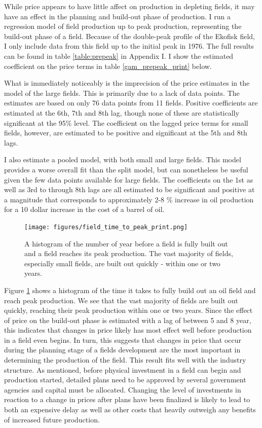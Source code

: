 \documentclass[11pt]{article}
\begin{document}
While price appears to have little affect on production in depleting fields, it may have an effect in the planning and build-out phase of production. I run a regression model of field production up to peak production, representing the build-out phase of a field.  Because of the double-peak profile of the Ekofisk field, I only include data from this field up to the initial peak in 1976.  The full results can be found in table \ref{table:prepeak} in Appendix I.  I show the estimated coefficient on the price terms in table \ref{gam_prepeak_print} below.  

What is immediately noticeably is the imprecision of the price estimates in the model of the large fields.  This is primarily due to a lack of data points.  The estimates are based on only 76 data points from 11 fields.  Positive coefficients are estimated at the 6th, 7th and 8th lag, though none of these are statistically significant at the 95\% level.  The coefficient on the lagged price terms for small fields, however, are estimated to be positive and significant at the 5th and 8th lags.  

I also estimate a pooled model, with both small and large fields.  This model provides a worse overall fit than the split model, but can nonetheless be useful given the few data points available for large fields.  The coefficients on the 1st as well as 3rd to through 8th lags are all estimated to be significant and positive at a magnitude that corresponds to approximately 2-8 \% increase in oil production for a 10 dollar increase in the cost of a barrel of oil.

\begin{figure}
	\texttt{[image: figures/field\_time\_to\_peak\_print.png]}
	\caption{A histogram of the number of year before a field is fully built out and a field reaches its peak production.  The vast majority of fields, especially small fields, are built out quickly - within one or two years.}
	\label{gam_buildout_hist}
\end{figure}

Figure \ref{gam_buildout_hist} shows a histogram of the time it takes to fully build out an oil field and reach peak production.  We see that the vast majority of fields are built out quickly, reaching their peak production within one or two years.  Since the effect of price on the build-out phase is estimated with a lag of between 5 and 8 year, this indicates that changes in price likely has most effect well before production in a field even begins.  In turn, this suggests that changes in price that occur during the planning stage of a fields development are the most important in determining the production of the field.  This result fits well with the industry structure.  As mentioned, before physical investment in a field can begin and production started, detailed plans need to be approved by several government agencies and capital must be allocated.  Changing the level of investments in reaction to a change in prices after plans have been finalized is likely to lead to both an expensive delay as well as other costs that heavily outweigh any benefits of increased future production.  
\end{document}
